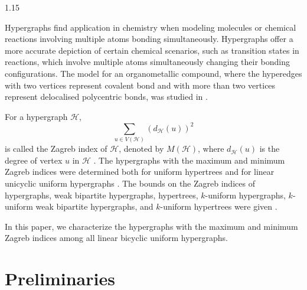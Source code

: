 \documentclass[preprint,12pt]{elsarticle1}
\numberwithin{equation}{section}
\begin{document}
\begin{spacing}{1.15}




Hypergraphs find application in chemistry when modeling molecules or
chemical reactions involving multiple atoms bonding simultaneously.
Hypergraphs offer a more accurate depiction of certain
chemical scenarios, such as transition states in reactions, which involve
multiple atoms simultaneously changing their bonding configurations. The model for an organometallic
compound, where the hyperedges with two vertices represent covalent
bond and with more than two vertices represent delocalised polycentric
bonds, was studied in \cite{Applicationfhypergraph}.

For a hypergraph $\mathcal{H}$, $$\sum\limits_{u\in V(\mathcal{H})}(d_{\mathcal{H}}(u))^{2}$$ is called the Zagreb index of $\mathcal{H}$, denoted by $M(\mathcal{H})$, where $d_{\mathcal{H}}(u)$ is the degree of vertex $u$ in $\mathcal{H}$ \cite{Kau2020Energies}.
The hypergraphs with the maximum and minimum Zagreb indices were determined both for uniform hypertrees and for linear unicyclic uniform hypergraphs \cite{2309.16925}.
The bounds on the Zagreb indices of hypergraphs, weak bipartite hypergraphs, hypertrees, $k$-uniform
hypergraphs, $k$-uniform weak bipartite hypergraphs, and $k$-uniform hypertrees were given \cite{zagrebhy}.


In this paper, we characterize the hypergraphs with the maximum and minimum Zagreb indices among all linear bicyclic uniform hypergraphs.



\section{Preliminaries}


\end{spacing}
\end{document}
